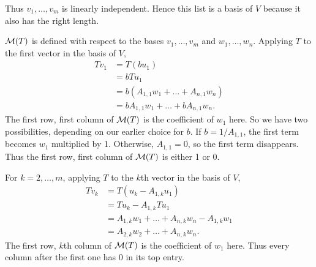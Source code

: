 \documentclass[a5paper]{article}
\begin{document}
    Thus $v_1,\dots,v_m$ is linearly independent.
    Hence this list is a basis of $V$ because it also has the right length.

    $\mathcal{M}(T)$ is defined with respect to the bases $v_1,\dots,v_m$ and $w_1,\dots,w_n$.
    Applying $T$ to the first vector in the basis of $V$,
\begin{align*}
        Tv_1 &= T(b u_1) \\
             &= b Tu_1 \\
             &= b (A_{1,1}w_1 + \dots + A_{n,1}w_n) \\
             &= b A_{1,1}w_1 + \dots + b A_{n,1}w_n .
\end{align*}
    The first row, first column of $\mathcal{M}(T)$ is the coefficient of $w_1$ here.
    So we have two possibilities, depending on our earlier choice for $b$.
    If $b=1/A_{1,1}$, the first term becomes $w_1$ multiplied by 1.
    Otherwise, $A_{1,1}=0$, so the first term disappears.
    Thus the first row, first column of $\mathcal{M}(T)$ is either 1 or 0.

    For $k=2,\dots,m$, applying $T$ to the $k$th vector in the basis of $V$,
\begin{align*}
        Tv_k &= T(u_k - A_{1,k}u_1) \\
             &= Tu_k - A_{1,k}Tu_1  \\
             &= A_{1,k}w_1 + \dots + A_{n,k}w_n - A_{1,k}w_1 \\
             &= A_{2,k}w_2 + \dots + A_{n,k}w_n .
\end{align*}
    The first row, $k$th column of $\mathcal{M}(T)$ is the coefficient of $w_1$ here.
    Thus every column after the first one has 0 in its top entry.
\end{document}
